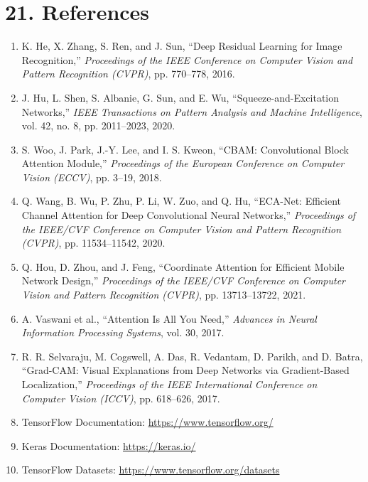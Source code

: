 \documentclass[10pt]{article}
\begin{document}
\section*{21. References}

\begin{enumerate}
\item K. He, X. Zhang, S. Ren, and J. Sun, ``Deep Residual Learning for
Image Recognition,'' \emph{Proceedings of the IEEE Conference on Computer
Vision and Pattern Recognition (CVPR)}, pp. 770--778, 2016.

\item J. Hu, L. Shen, S. Albanie, G. Sun, and E. Wu, ``Squeeze-and-Excitation
Networks,'' \emph{IEEE Transactions on Pattern Analysis and Machine
Intelligence}, vol. 42, no. 8, pp. 2011--2023, 2020.

\item S. Woo, J. Park, J.-Y. Lee, and I. S. Kweon, ``CBAM: Convolutional
Block Attention Module,'' \emph{Proceedings of the European Conference on
Computer Vision (ECCV)}, pp. 3--19, 2018.

\item Q. Wang, B. Wu, P. Zhu, P. Li, W. Zuo, and Q. Hu, ``ECA-Net: Efficient
Channel Attention for Deep Convolutional Neural Networks,'' \emph{Proceedings
of the IEEE/CVF Conference on Computer Vision and Pattern Recognition
(CVPR)}, pp. 11534--11542, 2020.

\item Q. Hou, D. Zhou, and J. Feng, ``Coordinate Attention for Efficient
Mobile Network Design,'' \emph{Proceedings of the IEEE/CVF Conference on
Computer Vision and Pattern Recognition (CVPR)}, pp. 13713--13722, 2021.

\item A. Vaswani et al., ``Attention Is All You Need,'' \emph{Advances in
Neural Information Processing Systems}, vol. 30, 2017.

\item R. R. Selvaraju, M. Cogswell, A. Das, R. Vedantam, D. Parikh, and
D. Batra, ``Grad-CAM: Visual Explanations from Deep Networks via
Gradient-Based Localization,'' \emph{Proceedings of the IEEE International
Conference on Computer Vision (ICCV)}, pp. 618--626, 2017.

\item TensorFlow Documentation: \url{https://www.tensorflow.org/}

\item Keras Documentation: \url{https://keras.io/}

\item TensorFlow Datasets: \url{https://www.tensorflow.org/datasets}
\end{enumerate}
\end{document}
